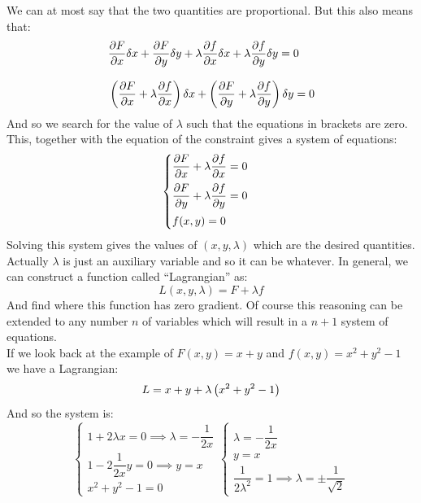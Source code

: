 We can at most say that the two quantities are proportional. But this also means that:
\begin{equation}
  \begin{split}
    &\pdv{F}{x}\delta x + \pdv{F}{y}\delta y + \lambda\pdv{f}{x}\delta x + \lambda\pdv{f}{y}\delta y = 0 \\[8pt]
    &\brackets{\pdv{F}{x}+ \lambda\pdv{f}{x}} \delta x + \brackets{\pdv{F}{y}+ \lambda\pdv{f}{y}}\delta y = 0
  \end{split}
\end{equation}
And so we search for the value of $\lambda$ such that the equations in brackets are zero. This, together with the equation of the constraint gives a system of equations:
\begin{equation}
  \begin{cases}
    \pdv{F}{x}+ \lambda\pdv{f}{x} = 0 \\[8pt]
    \pdv{F}{y}+ \lambda\pdv{f}{y} = 0 \\[8pt]
    f(x,y) = 0
  \end{cases}
\end{equation}
Solving this system gives the values of $(x, y, \lambda)$ which are the desired quantities. Actually $\lambda$ is just an auxiliary variable and so it can be whatever. In general, we can construct a function called ``Lagrangian'' as:
\begin{equation}
  L(x,y,\lambda) = F + \lambda f
\end{equation}
And find where this function has zero gradient. Of course this reasoning can be extended to any number $n$ of variables which will result in a $n+1$ system of equations.\\
If we look back at the example of $F(x,y) = x + y$ and $f(x,y) = x^2 + y^2 - 1$ we have a Lagrangian:
\begin{equation}
  L = x + y + \lambda\left(x^2 + y^2 - 1\right)
\end{equation}
And so the system is:
\begin{equation}
  \begin{cases}
    1 + 2\lambda x = 0 \implies \lambda = -\dfrac{1}{2x}\\[8pt]
    1 - 2\dfrac{1}{2x} y = 0 \implies y = x\\[8pt]
    x^2 + y^2 - 1 = 0
  \end{cases}
  \begin{cases}
    \lambda = -\dfrac{1}{2x}\\[8pt]
    y = x\\[8pt]
    \dfrac{1}{2\lambda^2} = 1 \implies \lambda = \pm \dfrac{1}{\sqrt{2}}
  \end{cases}
\end{equation}
